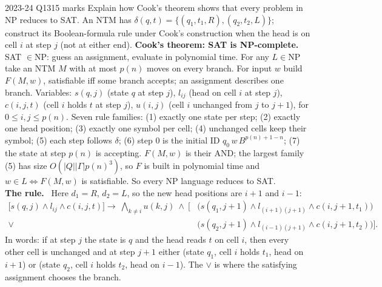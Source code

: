 \documentclass[10.5pt,a4paper]{article}
\newcommand{\ansh}[1]{\textbf{\color{exborder}#1}\ }
\newcommand{\NP}{\mathrm{NP}}
\begin{document}
\begin{examq}{2023-24 Q13}{15 marks}
Explain how Cook's theorem shows that every problem in NP reduces to SAT. An NTM has $\delta(q,t)=\{(q_1,t_1,R),(q_2,t_2,L)\}$; construct its
Boolean-formula rule under Cook's construction when the head is on cell $i$ at step $j$ (not at either end).
\tcblower
\ansh{Cook's theorem: SAT is NP-complete.} SAT $\in\NP$: guess an assignment, evaluate in polynomial time. For any $L\in\NP$ take an NTM
$M$ with at most $p(n)$ moves on every branch. For input $w$ build $F(M,w)$, satisfiable iff some branch accepts; an assignment describes one
branch. Variables: $s(q,j)$ (state $q$ at step $j$), $l_{ij}$ (head on cell $i$ at step $j$), $c(i,j,t)$ (cell $i$ holds $t$ at step $j$),
$u(i,j)$ (cell $i$ unchanged from $j$ to $j+1$), for $0\le i,j\le p(n)$. Seven rule families: (1) exactly one state per step; (2) exactly one
head position; (3) exactly one symbol per cell; (4) unchanged cells keep their symbol; (5) each step follows $\delta$; (6) step 0 is the initial
ID $q_0\,w\,B^{p(n)+1-n}$; (7) the state at step $p(n)$ is accepting. $F(M,w)$ is their AND; the largest family (5) has size
$O(|Q||\Gamma|p(n)^3)$, so $F$ is built in polynomial time and $w\in L\iff F(M,w)$ is satisfiable. So every NP language reduces to SAT.\\
\ansh{The rule.} Here $d_1=R$, $d_2=L$, so the new head positions are $i+1$ and $i-1$:
\[\begin{aligned}\big[s(q,j)\wedge l_{ij}\wedge c(i,j,t)\big]\to\ \bigwedge_{k\ne i}u(k,j)\ \wedge\ \Big[&\big(s(q_1,j{+}1)\wedge l_{(i+1)(j+1)}\wedge c(i,j{+}1,t_1)\big)\\
\vee\ &\big(s(q_2,j{+}1)\wedge l_{(i-1)(j+1)}\wedge c(i,j{+}1,t_2)\big)\Big].\end{aligned}\]
In words: if at step $j$ the state is $q$ and the head reads $t$ on cell $i$, then every other cell is unchanged and at step $j+1$ either
(state $q_1$, cell $i$ holds $t_1$, head on $i+1$) or (state $q_2$, cell $i$ holds $t_2$, head on $i-1$). The $\vee$ is where the satisfying
assignment chooses the branch.
\end{examq}
\end{document}
